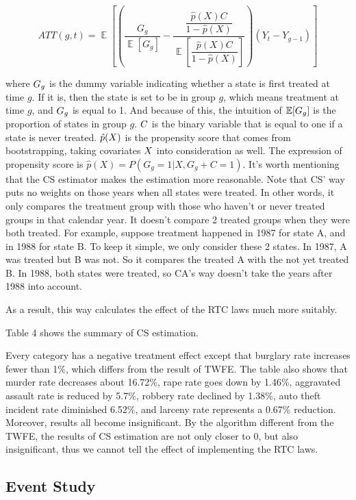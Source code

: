 \documentclass{article}
\DeclareMathOperator{\EX}{\mathbb{E}}
\begin{document}
$$
    ATT(g, t) = \EX\left[\left(\dfrac{G_g}{\EX[G_g]}-\dfrac{\dfrac{\hat{p}(X)C}{1-\hat{p}(X)}}{\EX\left[\dfrac{\hat{p}(X)C}{1-\hat{p}(X)}\right]}\right)\left(Y_t-Y_{g-1}\right)\right]
$$

where \( \mathnormal{G_g} \) is the dummy variable indicating whether a state is first treated at time $g$. If it is, then the state is set to be in group $g$, which means treatment at time $g$, and \( \mathnormal{G_g} \) is equal to 1. And because of this, the intuition of \( \mathnormal{\mathbb{E} [G_g]} \) is the proportion of states in group $g$. \( \mathnormal{C} \) is the binary variable that is equal to one if a state is never treated. \( \mathnormal{\hat{p}(X)} \) is the propensity score that comes from bootstrapping, taking covariates \( \mathnormal{X} \) into consideration as well. The expression of propensity score is $\hat{p}\left(X\right)=P\left(G_{g}=1|X, G_{g}+C=1\right)$. It's worth mentioning that the CS estimator makes the estimation more reasonable. Note that CS' way puts no weights on those years when all states were treated. In other words, it only compares the treatment group with those who haven't or never treated groups in that calendar year. It doesn't compare 2 treated groups when they were both treated. For example, suppose treatment happened in 1987 for state A, and in 1988 for state B. To keep it simple, we only consider these 2 states. In 1987, A was treated but B was not. So it compares the treated A with the not yet treated B. In 1988, both states were treated, so CA's way doesn't take the years after 1988 into account. 

As a result, this way calculates the effect of the RTC laws much more suitably.

Table 4 shows the summary of CS estimation.



Every category has a negative treatment effect except that burglary rate increases fewer than 1\%, which differs from the result of TWFE. The table also shows that murder rate decreases about 16.72\%, rape rate goes down by 1.46\%, aggravated assault rate is reduced by 5.7\%, robbery rate declined by 1.38\%, auto theft incident rate diminished 6.52\%, and larceny rate represents a 0.67\% reduction. Moreover, results all become insignificant. By the algorithm different from the TWFE, the results of CS estimation are not only closer to 0, but also insignificant, thus we cannot tell the effect of implementing the RTC laws. 

\subsection{Event Study}
\end{document}
